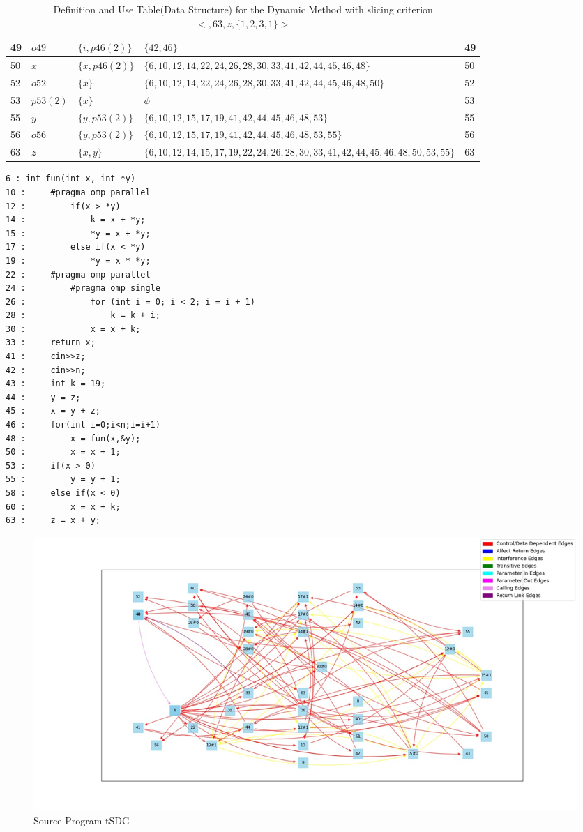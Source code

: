 \documentclass[conference]{IEEEtran}
\begin{document}
\begin{table}[t]
\begin{tabular}{| p{} | p{} | p{} |p{} |p{} |}
        49 & $o49$ & $\{i , p46(2)\}$ & $\{42 , 46\}$ & 49 \\\hline
        50 & $x$ & $\{x , p46(2)\}$ & $\{6 , 10 , 12 , 14 , 22 , 24 , 26 , 28 , 30 , 33 , 41 , 42 , 44 , 45 , 46 , 48\}$ & 50 \\\hline
        52 & $o52$ & $\{x\}$ & $\{6 , 10 , 12 , 14 , 22 , 24 , 26 , 28 , 30 , 33 , 41 , 42 , 44 , 45 , 46 , 48 , 50\}$ & 52 \\\hline
        53 & $p53(2)$ & $\{x\}$ &  $\phi$ & 53 \\\hline
        55 & $y$ & $\{y , p53(2)\}$ &  $\{6 , 10 , 12 , 15 , 17 , 19 , 41 , 42 , 44 , 45 , 46 , 48 , 53\}$ & 55 \\\hline
        56 & $o56$ & $\{y , p53(2)\}$ &  $\{6 , 10 , 12 , 15 , 17 , 19 , 41 , 42 , 44 , 45 , 46 , 48 , 53 , 55\}$ & 56 \\\hline
        63 & $z$ & $\{x , y\}$ & $\{6 , 10 , 12 , 14 , 15 , 17 , 19 , 22 , 24 , 26 , 28 , 30 , 33 , 41 , 42 , 44 , 45 , 46 , 48 , 50 , 53 , 55\}$ & 63 \\\hline
    \end{tabular}
    \caption{Definition and Use Table(Data Structure) for the Dynamic Method with slicing criterion $<,63,z,\{1,2,3,1\}>$}
    \label{tab:my_label}
\end{table}
\begin{lstlisting}
6 : int fun(int x, int *y)
10 :     #pragma omp parallel
12 :         if(x > *y) 
14 :             k = x + *y;
15 :             *y = x + *y;
17 :         else if(x < *y)
19 :             *y = x * *y;
22 :     #pragma omp parallel 
24 :         #pragma omp single
26 :             for (int i = 0; i < 2; i = i + 1)
28 :                 k = k + i;
30 :             x = x + k;
33 :     return x;
41 :     cin>>z;
42 :     cin>>n;
43 :     int k = 19;
44 :     y = z;
45 :     x = y + z;
46 :     for(int i=0;i<n;i=i+1)
48 :         x = fun(x,&y);
50 :         x = x + 1;
53 :     if(x > 0)
55 :         y = y + 1;
58 :     else if(x < 0)
60 :         x = x + k;
63 :     z = x + y;
\end{lstlisting}
\begin{figure}[p]
    \centering
    \includegraphics[scale=0.5]{sourcetSDG.jpeg}
    \caption{Source Program tSDG}
    \label{fig:my_label}
\end{figure}
\end{document}
